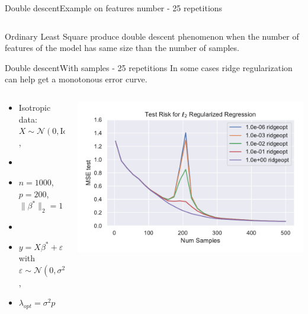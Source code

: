 \documentclass[10pt,aspectratio=43]{beamer}
\begin{document}
\begin{frame}{Double descent}{Example on features number - 25 repetitions}
\begin{columns}
\begin{column}{0.7\textwidth}
\begin{center}
             \end{center}
        \end{column}
        \end{columns}
        \begin{block}{}
            Ordinary Least Square produce double descent phenomenon when the number of features of the model has same size than the number of samples.
        \end{block}
\end{frame}


\begin{frame}{Double descent}{With samples \citep{nakkiran2020optimal} - 25 repetitions}
    In some cases ridge regularization can help get a monotonous error curve.
    \begin{columns}
        \begin{column}{0.46\textwidth}
            \begin{itemize}
                \item Isotropic data: $X\sim\mathcal{N}(0,\mathrm{Id})$,
                \item[]
                \item $n=1000$, $p=200$, $\|\beta^*\|_2=1$
                \item[]
                \item $y = X\beta^*+\varepsilon$ with $\varepsilon\sim \mathcal{N}(0, \sigma^2\mathrm{Id})$,
                \item $\lambda_{opt} = \sigma^2p$
            \end{itemize}
        \end{column}
        \begin{column}{0.7\textwidth}
            \begin{center}
             \includegraphics[width=1\textwidth]{double_descent.pdf}

\end{center}
\end{column}
\end{columns}
\end{frame}
\end{document}
